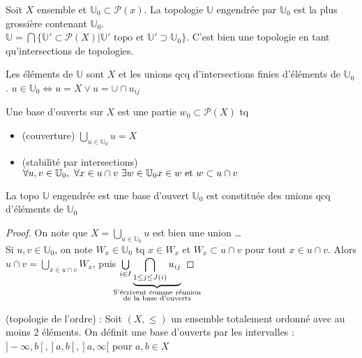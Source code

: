 \begin{definition}
     Soit $X$ ensemble et $\mathbb{U}_0\subset \mathcal{P}(x)$. La topologie $\mathbb{U}$ engendrée par $\mathbb{U}_0$ est la plus grossière contenant $\mathbb{U}_0$. \\
     $\mathbb{U}=\bigcap \{\mathbb{U}'\subset \mathcal{P}(X)|\mathbb{U}'\text{ topo et }\mathbb{U}'\supset \mathbb{U}_0\}$. C'est bien une topologie en tant qu'intersections de topologies.
\end{definition}
\begin{remarque}
 Les éléments de $\mathbb{U}$ sont $X$ et les unions qcq d'intersections finies d'éléments de $\mathbb{U}_0$. $u\in \mathbb{U}_0 \Leftrightarrow u=X \vee u=\cup \cap u_{ij}$
\end{remarque}
\begin{definition}
 Une base d'ouverts sur $X$ est une partie $w_0\subset \mathcal{P}(X)$ tq
 \begin{itemize}
     \item (couverture) $\bigcup\limits_{u\in \mathbb{U}_0}u=X$
    \item (stabilité par intersections) $\forall u,v\in \mathbb{U}_0, \ \forall x\in u\cap v\ \exists w\in \mathbb{U}_0\ \\x\in w\text{ et } w\subset u\cap v$
\end{itemize}
\end{definition}
\begin{proposition}
    La topo $\mathbb{U}$ engendrée est une base d'ouvert $\mathbb{U}_0$ est constituée des unions qcq d'éléments de $\mathbb{U}_0$
\end{proposition}
\begin{proof}
    On note que $X=\bigcup\limits_{u\in \mathbb{U}_0}u$ est bien une union \ldots\\
Si $u,v\in \mathbb{U}_0$, on note $W_x\in \mathbb{U}_0$ tq $x\in W_x$  et $W_x \subset u\cap v$ pour tout $x\in u\cap v$. Alors $u\cap v=\bigcup\limits_{x\in u\cap v}W_x$, puis $\bigcup\limits_{i\in I}\underbrace{\bigcap\limits_{1\le j\le J(i)}u_{ij}}_{\mathclap{\substack{\text{S'écrivent comme réunion} \\\text{de la base d'ouverts}}}}$
\end{proof}
\begin{ex}
    (topologie de l'ordre) : Soit $(X,\le )$ un ensemble totalement ordonné avec au moins 2 éléments. On définit une base d'ouverts par les intervalles : $]-\infty , b[, ]a,b[, ]a,\infty [$ pour $ a,b\in X$
\end{ex}
